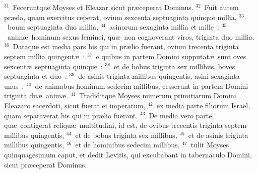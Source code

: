 ${}^{31}$~Feceruntque Moyses et Eleazar sicut pr\ae ceperat Dominus.
${}^{32}$~Fuit autem pr\ae da, quam exercitus ceperat, ovium sexcenta septuaginta quinque millia,
${}^{33}$~boum septuaginta duo millia,
${}^{34}$~asinorum sexaginta millia et mille~:
${}^{35}$~anim\ae\ hominum sexus feminei, qu\ae\ non cognoverant viros, triginta duo millia.
${}^{36}$~Dataque est media pars his qui in pr\ae lio fuerant, ovium trecenta triginta septem millia quingent\ae~:
${}^{37}$~e quibus in partem Domini supputat\ae\ sunt oves sexcent\ae\ septuaginta quinque~:
${}^{38}$~et de bobus triginta sex millibus, boves septuaginta et duo~:
${}^{39}$~de asinis triginta millibus quingentis, asini sexaginta unus~:
${}^{40}$~de animabus hominum sedecim millibus, cesserunt in partem Domini triginta du\ae\ anim\ae .
${}^{41}$~Tradiditque Moyses numerum primitiarum Domini Eleazaro sacerdoti, sicut fuerat ei imperatum,
${}^{42}$~ex media parte filiorum Isra\"el, quam separaverat his qui in pr\ae lio fuerant.
${}^{43}$~De media vero parte, qu\ae\ contigerat reliqu\ae\ multitudini, id est, de ovibus trecentis triginta septem millibus quingentis,
${}^{44}$~et de bobus triginta sex millibus,
${}^{45}$~et de asinis triginta millibus quingentis,
${}^{46}$~et de hominibus sedecim millibus,
${}^{47}$~tulit Moyses quinquagesimum caput, et dedit Levitis, qui excubabant in tabernaculo Domini, sicut pr\ae ceperat Dominus.


